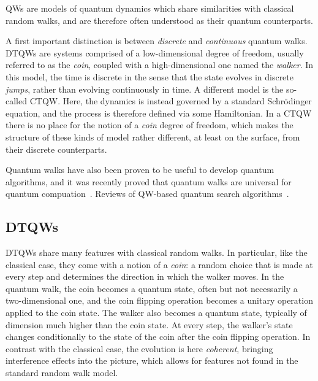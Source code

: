 \acp{QW} are models of quantum dynamics which share similarities with classical random walks, and are therefore often understood as their quantum counterparts.

A first important distinction is between \textit{discrete} and \textit{continuous} quantum walks.
\acp{DTQW} are systems comprised of a low-dimensional degree of freedom, usually referred to as the \textit{coin}, coupled with a high-dimensional one named the \textit{walker}.
In this model, the time is discrete in the sense that the state evolves in discrete \textit{jumps}, rather than evolving continuously in time.
A different model is the so-called \ac{CTQW}. Here, the dynamics is instead governed by a standard Schr\"odinger equation, and the process is therefore defined via some Hamiltonian. In a \ac{CTQW} there is no place for the notion of a \textit{coin} degree of freedom, which makes the structure of these kinds of model rather different, at least on the surface, from their discrete counterparts.

Quantum walks have also been proven to be useful to develop quantum algorithms, and it was recently proved that quantum walks are universal for quantum compuation~\cite{childs2009universal,childs2003exponential,lovett2010universal,lovett2018quantum,underwood2010universal}.
Reviews of QW-based quantum search algorithms~\cite{ambainis2011search,ambainis2008quantum,ambainis2010developments,kempe2003quantum,kendon2006random,santha2008quantum,venegasandraca2012quantum,venegasandraca2008quantum}.

\subsection{DTQWs}

\acp{DTQW} share many features with classical random walks.
In particular, like the classical case, they come with a notion of a \textit{coin}: a random choice that is made at every step and determines the direction in which the walker moves.
In the quantum walk, the coin becomes a quantum state, often but not necessarily a two-dimensional one, and the coin flipping operation becomes a unitary operation applied to the coin state.
The walker also becomes a quantum state, typically of dimension much higher than the coin state. At every step, the walker's state changes conditionally to the state of the coin after the coin flipping operation.
In contrast with the classical case, the evolution is here \textit{coherent}, bringing interference effects into the picture, which allows for features not found in the standard random walk model.

